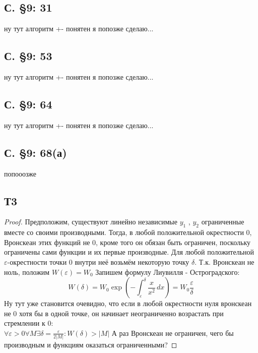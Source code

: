 \documentclass{article}
\begin{document}
\subsection{С. \S9: 31 }
ну тут алгоритм +- понятен я попозже сделаю...
\subsection{С. \S9: 53 }
ну тут алгоритм +- понятен я попозже сделаю...
\subsection{С. \S9: 64 }
ну тут алгоритм +- понятен я попозже сделаю...
\subsection{С. \S9: 68(а)}
попооозже
\subsection{Т3} 
\begin{proof}
Предположим, существуют линейно независимые $y_1$ , $y_2$ ограниченные вместе со своими производными. Тогда, в любой положительной окрестности 0, Вронскеан этих функций не 0, кроме того он обязан быть ограничен, поскольку ограничены сами функции и их первые производные. Для любой положительной $\varepsilon$-окрестности точки 0 внутри неё возьмём некоторую точку $\delta$. Т.к. Вронскеан не ноль, положим $W(\varepsilon)=W_0$ Запишем формулу Лиувилля - Остроградского:
\begin{equation}
    W(\delta)=W_0 \exp \left(- \int^{\delta}_{\varepsilon} \frac{x}{x^2} \, dx  \right) = W_0 \frac{\varepsilon}{\delta}
\end{equation}
Ну тут уже становится очевидно, что если в любой окрестности нуля вронскеан не 0 хотя бы в одной точке, он начинает неограниченно возрастать при стремлении к 0:\\
$\forall  \varepsilon > 0 \forall M \exists \delta =  \frac{\varepsilon}{2|M|}: W(\delta)>|M|$
А раз Вронскеан не ограничен, чего бы производным и функциям оказаться ограниченными?
\end{proof}
\end{document}
